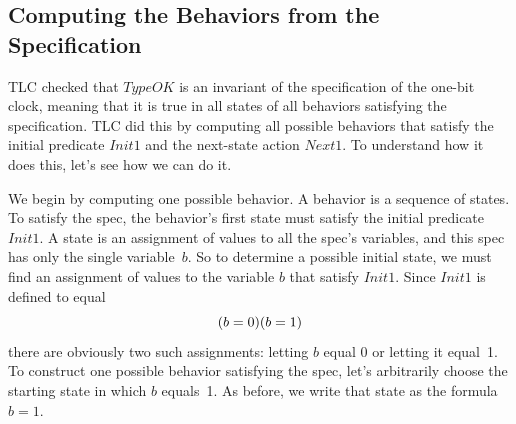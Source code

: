 \subsection{Computing the Behaviors from the Specification}

TLC checked that $TypeOK$ is an invariant of the specification of
the one-bit clock, meaning that it is true in all states of all
behaviors satisfying the specification.  TLC did this by computing
all possible behaviors that satisfy the initial predicate $Init1$ and
the next-state action $Next1$.  To understand how it does this, let's
see how we can do it.

We begin by computing one possible behavior.  A behavior is a sequence
of states.  To satisfy
the spec, the behavior's first state must satisfy the initial predicate
$Init1$.
A state is an assignment of values to all the spec's
variables, and this spec has only the single variable~$b$.  So to determine
a possible initial state, we must find an assignment of values to the
variable $b$ that satisfy $Init1$.  Since $Init1$ is defined to equal
 \[ (b=0) \/ (b=1) \]
there are obviously two such assignments: letting $b$ equal 0 or
letting it equal~1.  To construct one possible behavior satisfying the
spec, let's arbitrarily choose the starting state in which $b$
equals~1.  As before, we write that state as the formula $b=1$.

